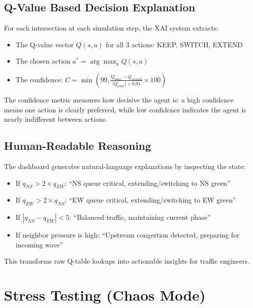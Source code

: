 \documentclass[12pt, a4paper]{article}
\begin{document}
\subsection{Q-Value Based Decision Explanation}

For each intersection at each simulation step, the XAI system extracts:
\begin{itemize}[nosep]
    \item The Q-value vector $Q(s, a)$ for all 3 actions: KEEP, SWITCH, EXTEND
    \item The chosen action $a^* = \arg\max_a Q(s, a)$
    \item The confidence: $C = \min\left(99, \frac{Q_{max} - Q_{second}}{|Q_{max}| + 0.01} \times 100\right)$
\end{itemize}

The confidence metric measures how decisive the agent is: a high confidence means one action is clearly preferred, while low confidence indicates the agent is nearly indifferent between actions.

\subsection{Human-Readable Reasoning}

The dashboard generates natural-language explanations by inspecting the state:
\begin{itemize}[nosep]
    \item If $q_{NS} > 2 \times q_{EW}$: ``NS queue critical, extending/switching to NS green''
    \item If $q_{EW} > 2 \times q_{NS}$: ``EW queue critical, extending/switching to EW green''
    \item If $|q_{NS} - q_{EW}| < 5$: ``Balanced traffic, maintaining current phase''
    \item If neighbor pressure is high: ``Upstream congestion detected, preparing for incoming wave''
\end{itemize}

This transforms raw Q-table lookups into actionable insights for traffic engineers.

\section{Stress Testing (Chaos Mode)}
\end{document}
